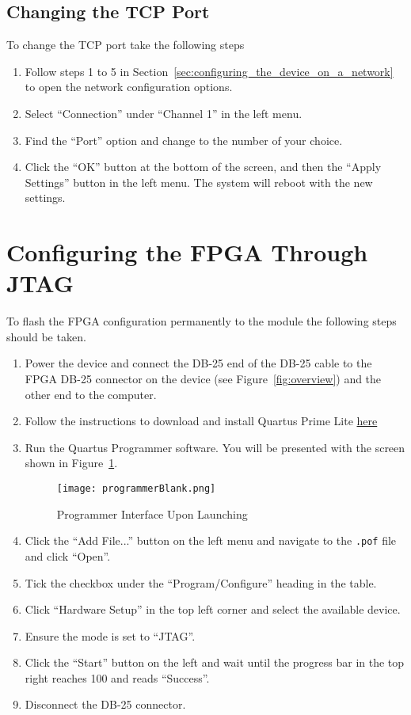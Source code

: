 \subsection{Changing the TCP Port} %
\label{sub:changing_the_tcp_port}
To change the TCP port take the following steps
\begin{enumerate}
	\item Follow steps 1 to 5 in Section~\ref{sec:configuring_the_device_on_a_network} to open the network configuration options.
	\item Select ``Connection'' under ``Channel 1'' in the left menu.
	\item Find the ``Port'' option and change to the number of your choice.
	\item Click the ``OK'' button at the bottom of the screen, and then the ``Apply Settings'' button in the left menu. The system will reboot with the new settings.
\end{enumerate}

\section{Configuring the FPGA Through JTAG} %
\label{sec:configuring_the_fpga_through_jtag}
To flash the FPGA configuration permanently to the module the following steps should be taken.
\begin{enumerate}
	\item Power the device and connect  the  DB-25 end of the DB-25 cable to the FPGA DB-25 connector on the device (see Figure~\ref{fig:overview}) and the other end to the computer.
	\item Follow the instructions to download and install Quartus Prime Lite \href{https://fpgasoftware.intel.com/}{here}
	\item Run the Quartus Programmer software. You will be presented with the screen shown in Figure~\ref{fig:ProgBlank}.
	\begin{figure}[tbh!]
		\centering
		\texttt{[image: programmerBlank.png]}
		\caption{Programmer Interface Upon Launching}
		\label{fig:ProgBlank}
	\end{figure}
	\item Click the ``Add File...'' button on the left menu and navigate to the \texttt{.pof} file and click ``Open''.
	\item Tick the checkbox under the ``Program/Configure'' heading in the table.
	\item Click ``Hardware Setup'' in the top left corner and select the available device.
	\item Ensure the mode is set to ``JTAG''.
	\item Click the ``Start'' button on the left and wait until the progress bar in the top right reaches 100 and reads ``Success''.
	\item Disconnect the DB-25 connector.
\end{enumerate}
